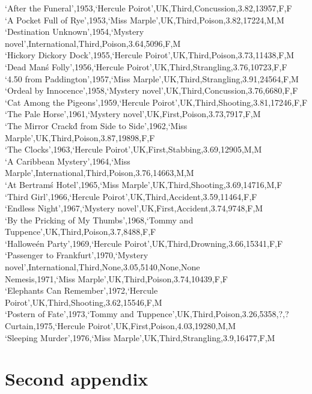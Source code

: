 \documentclass{mproj}
\begin{document}
`After the Funeral',1953,`Hercule Poirot',UK,Third,Concussion,3.82,13957,F,F\\
`A Pocket Full of Rye',1953,`Miss Marple',UK,Third,Poison,3.82,17224,M,M\\
`Destination Unknown',1954,`Mystery novel',International,Third,Poison,3.64,5096,F,M\\
`Hickory Dickory Dock',1955,`Hercule Poirot',UK,Third,Poison,3.73,11438,F,M\\
`Dead Man\'s Folly',1956,`Hercule Poirot',UK,Third,Strangling,3.76,10723,F,F\\
`4.50 from Paddington',1957,`Miss Marple',UK,Third,Strangling,3.91,24564,F,M\\
`Ordeal by Innocence',1958,`Mystery novel',UK,Third,Concussion,3.76,6680,F,F\\
`Cat Among the Pigeons',1959,`Hercule Poirot',UK,Third,Shooting,3.81,17246,F,F\\
`The Pale Horse',1961,`Mystery novel',UK,First,Poison,3.73,7917,F,M\\
`The Mirror Crack\'d from Side to Side',1962,`Miss Marple',UK,Third,Poison,3.87,19898,F,F\\
`The Clocks',1963,`Hercule Poirot',UK,First,Stabbing,3.69,12905,M,M\\
`A Caribbean Mystery',1964,`Miss Marple',International,Third,Poison,3.76,14663,M,M\\
`At Bertram\'s Hotel',1965,`Miss Marple',UK,Third,Shooting,3.69,14716,M,F\\
`Third Girl',1966,`Hercule Poirot',UK,Third,Accident,3.59,11464,F,F\\
`Endless Night',1967,`Mystery novel',UK,First,Accident,3.74,9748,F,M\\
`By the Pricking of My Thumbs',1968,`Tommy and Tuppence',UK,Third,Poison,3.7,8488,F,F\\
`Hallowe\'en Party',1969,`Hercule Poirot',UK,Third,Drowning,3.66,15341,F,F\\
`Passenger to Frankfurt',1970,`Mystery novel',International,Third,None,3.05,5140,None,None\\
Nemesis,1971,`Miss Marple',UK,Third,Poison,3.74,10439,F,F\\
`Elephants Can Remember',1972,`Hercule Poirot',UK,Third,Shooting,3.62,15546,F,M\\
`Postern of Fate',1973,`Tommy and Tuppence',UK,Third,Poison,3.26,5358,?,?\\
Curtain,1975,`Hercule Poirot',UK,First,Poison,4.03,19280,M,M\\
`Sleeping Murder',1976,`Miss Marple',UK,Third,Strangling,3.9,16477,F,M\\

\chapter{Second appendix}
\end{document}

